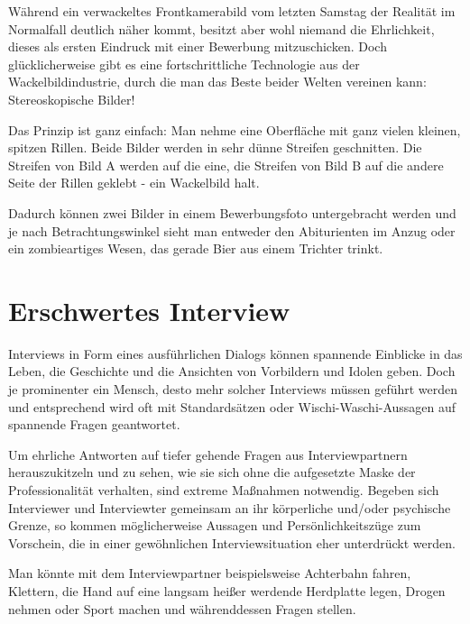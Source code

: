 \documentclass[a5paper,pagesize,10pt,bibtotoc,pointlessnumbers,normalheadings,DIV=9,twoside=false]{scrbook}
\begin{document}
Während ein verwackeltes Frontkamerabild vom letzten Samstag der Realität im Normalfall deutlich näher kommt, besitzt aber wohl niemand die Ehrlichkeit, dieses als ersten Eindruck mit einer Bewerbung mitzuschicken.
Doch glücklicherweise gibt es eine fortschrittliche Technologie aus der Wackelbildindustrie, durch die man das Beste beider Welten vereinen kann:
Stereoskopische Bilder!

Das Prinzip ist ganz einfach:
Man nehme eine Oberfläche mit ganz vielen kleinen, spitzen Rillen.
Beide Bilder werden in sehr dünne Streifen geschnitten.
Die Streifen von Bild A werden auf die eine, die Streifen von Bild B auf die andere Seite der Rillen geklebt - ein Wackelbild halt.

Dadurch können zwei Bilder in einem Bewerbungsfoto untergebracht werden und je nach Betrachtungswinkel sieht man entweder den Abiturienten im Anzug oder ein zombieartiges Wesen, das gerade Bier aus einem Trichter trinkt.

\chapter{Erschwertes Interview}

Interviews in Form eines ausführlichen Dialogs können spannende Einblicke in das Leben, die Geschichte und die Ansichten von Vorbildern und Idolen geben.
Doch je prominenter ein Mensch, desto mehr solcher Interviews müssen geführt werden und entsprechend wird oft mit Standardsätzen oder Wischi-Waschi-Aussagen auf spannende Fragen geantwortet.

Um ehrliche Antworten auf tiefer gehende Fragen aus Interviewpartnern herauszukitzeln und zu sehen, wie sie sich ohne die aufgesetzte Maske der Professionalität verhalten, sind extreme Maßnahmen notwendig.
Begeben sich Interviewer und Interviewter gemeinsam an ihr körperliche und/oder psychische Grenze, so kommen möglicherweise Aussagen und Persönlichkeitszüge zum Vorschein, die in einer gewöhnlichen Interviewsituation eher unterdrückt werden.

Man könnte mit dem Interviewpartner beispielsweise Achterbahn fahren, Klettern, die Hand auf eine langsam heißer werdende Herdplatte legen, Drogen nehmen oder Sport machen und währenddessen Fragen stellen.


\end{document}
